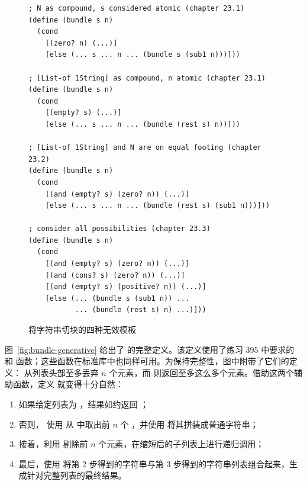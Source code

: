 \begin{figure}[htbp]
  \centering
\begin{lstlisting}[language=BSL, basicstyle=\scriptsize\ttfamily]
; N as compound, s considered atomic (chapter 23.1)
(define (bundle s n)
  (cond
    [(zero? n) (...)]
    [else (... s ... n ... (bundle s (sub1 n)))]))

; [List-of 1String] as compound, n atomic (chapter 23.1)
(define (bundle s n)
  (cond
    [(empty? s) (...)]
    [else (... s ... n ... (bundle (rest s) n))]))

; [List-of 1String] and N are on equal footing (chapter 23.2)
(define (bundle s n)
  (cond
    [(and (empty? s) (zero? n)) (...)]
    [else (... s ... n ... (bundle (rest s) (sub1 n)))]))

; consider all possibilities (chapter 23.3)
(define (bundle s n)
  (cond
    [(and (empty? s) (zero? n)) (...)]
    [(and (cons? s) (zero? n)) (...)]
    [(and (empty? s) (positive? n)) (...)]
    [else (... (bundle s (sub1 n)) ...
           ... (bundle (rest s) n) ...)]))
\end{lstlisting}
  \caption{将字符串切块的四种无效模板}
  \label{fig:bundle-templates}
\end{figure}

图~\ref{fig:bundle-generative} 给出了  的完整定义。该定义使用了练习 395 中要求的  和  函数；这些函数在标准库中也同样可用。为保持完整性，图中附带了它们的定义： 从列表头部至多丢弃 $n$ 个元素，而  则返回至多这么多个元素。借助这两个辅助函数，定义  就变得十分自然：

\begin{enumerate}
  \item 如果给定列表为 ，结果如约返回 ；
  \item 否则， 使用  从  中取出前 $n$ 个 ，并使用  将其拼装成普通字符串；
  \item 接着，利用  剔除前 $n$ 个元素，在缩短后的子列表上进行递归调用；
  \item 最后，使用  将第 2 步得到的字符串与第 3 步得到的字符串列表组合起来，生成针对完整列表的最终结果。
\end{enumerate}

